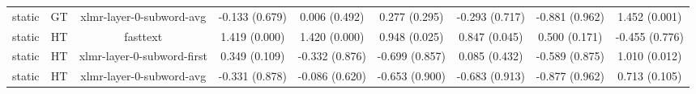 \begin{sidewaystable}[htb]
\begin{tabular}{@{}ccccccccc@{}}
        static & GT & xlmr-layer-0-subword-avg & -0.133 (0.679) & 0.006 (0.492) & 0.277 (0.295) & -0.293 (0.717) & -0.881 (0.962) & 1.452 (0.001) \\
        static & HT & fasttext & 1.419 (0.000) & 1.420 (0.000) & 0.948 (0.025) & 0.847 (0.045) & 0.500 (0.171) & -0.455 (0.776) \\
        static & HT & xlmr-layer-0-subword-first & 0.349 (0.109) & -0.332 (0.876) & -0.699 (0.857) & 0.085 (0.432) & -0.589 (0.875) & 1.010 (0.012) \\
        static & HT & xlmr-layer-0-subword-avg & -0.331 (0.878) & -0.086 (0.620) & -0.653 (0.900) & -0.683 (0.913) & -0.877 (0.962) & 0.713 (0.105) \\
        \bottomrule
    \end{tabular}
\end{sidewaystable}